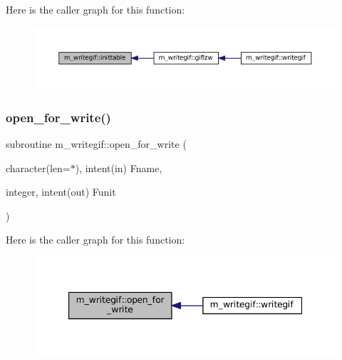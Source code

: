 Here is the caller graph for this function\+:\nopagebreak
\begin{figure}[H]
\begin{center}
\leavevmode
\includegraphics[width=350pt]{namespacem__writegif_aed61b15f90188ddf39b71aa0c73a82a8_icgraph}
\end{center}
\end{figure}
\mbox{\label{namespacem__writegif_adb045213dd61508ad7dc7e5640fde67d}} 
\subsubsection{\texorpdfstring{open\+\_\+for\+\_\+write()}{open\_for\_write()}}
{\footnotesize\ttfamily subroutine m\+\_\+writegif\+::open\+\_\+for\+\_\+write (\begin{DoxyParamCaption}\item[{character(len=$\ast$), intent(in)}]{Fname,  }\item[{integer, intent(out)}]{Funit }\end{DoxyParamCaption})\hspace{0.3cm}{\ttfamily [private]}}

Here is the caller graph for this function\+:\nopagebreak
\begin{figure}[H]
\begin{center}
\leavevmode
\includegraphics[width=347pt]{namespacem__writegif_adb045213dd61508ad7dc7e5640fde67d_icgraph}
\end{center}
\end{figure}
\mbox{\label{namespacem__writegif_a27e0ec2c6e05428641179bf35762adb7}} 
